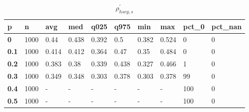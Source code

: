 \begin{table}[h]
 \centering 
\footnotesize
\caption{$\rho_{hscg,s}^\prime $}
\label{tab:alphahscgs}
\begin{tabular}[h]{|l|l|l|l|l|l|l|l|l|l|
    } \hline
\textbf{ p} & \textbf{ n} & \textbf{ avg} & \textbf{ med} & \textbf{ q025} & \textbf{ q975} & \textbf{ min} & \textbf{ max} & \textbf{ pct\_0} & \textbf{ pct\_nan}
    \\ \hline
  \textbf{  0} & 1000 &  0.44 & 0.438 & 0.392 &   0.5 & 0.382 & 0.524 &   0 & 0
    \\ \hline
  \textbf{0.1} & 1000 & 0.414 & 0.412 & 0.364 &  0.47 &  0.35 & 0.484 &   0 & 0
    \\ \hline
  \textbf{0.2} & 1000 & 0.383 &  0.38 & 0.339 & 0.438 & 0.327 & 0.466 &   1 & 0
    \\ \hline
  \textbf{0.3} & 1000 & 0.349 & 0.348 & 0.303 & 0.378 & 0.303 & 0.378 &  99 & 0
    \\ \hline
  \textbf{0.4} & 1000 & - & - & - & - & - & - & 100 & 0
    \\ \hline
  \textbf{0.5} & 1000 & - & - & - & - & - & - & 100 & 0
    \\ \hline
 \end{tabular}
 \end{table}
